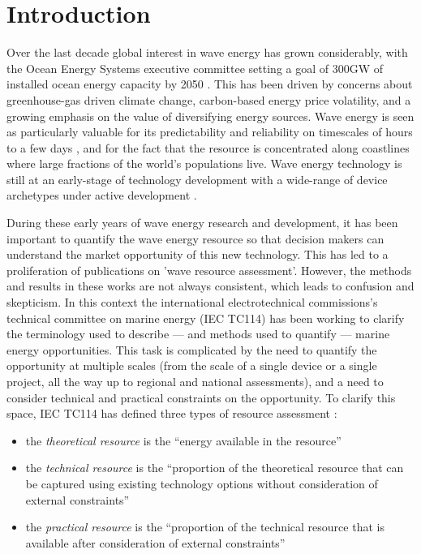 \section{Introduction}

Over the last decade global interest in wave energy has grown considerably, with
the Ocean Energy Systems executive committee setting a goal of 300GW of
installed ocean energy capacity by 2050
\citep[]{huckerbyInternationalVisionOcean2017}. This has been driven by concerns
about greenhouse-gas driven climate change, carbon-based energy price
volatility, and a growing emphasis on the value of diversifying energy
sources. Wave energy is seen as particularly valuable for its predictability and
reliability on timescales of hours to a few days
\citep{parkinsonIntegratingOceanWave2015}, and for the fact that the resource is
concentrated along coastlines where large fractions of the world's populations
live. Wave energy technology is still at an early-stage of technology
development with a wide-range of device archetypes under active development
\citep[]{babaritOceanWaveEnergy2017}.

During these early years of wave energy research and development, it has been
important to quantify the wave energy resource so that decision makers can
understand the market opportunity of this new technology. This has led to a
proliferation of publications on 'wave resource assessment'. However, the
methods and results in these works are not always consistent, which leads to confusion
and skepticism. In this context the
international electrotechnical commissions's technical committee on marine
energy (IEC TC114) has been working to clarify the terminology used to describe
— and methods used to quantify — marine energy opportunities. This task is
complicated by the need to quantify the opportunity at multiple scales (from the
scale of a single device or a single project, all the way up to regional and
national assessments), and a need to consider technical and practical
constraints on the opportunity. To clarify this space, IEC TC114 has defined three types of resource assessment
\citep{internationalelectrotechnicalcommissionPartTerminology2011} :

\begin{itemize}
  \item the { \it theoretical resource} is the ``energy available in the resource''
  \item the {\it technical resource} is the ``proportion of the theoretical resource that can be captured using existing technology options without consideration of external constraints''
  \item the {\it practical resource} is the ``proportion of the technical resource that is available after consideration of external constraints''
\end{itemize}

